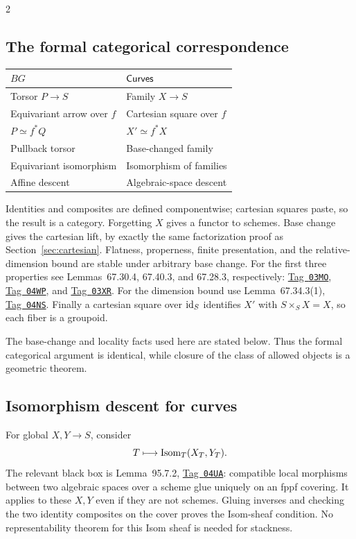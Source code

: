 \documentclass[12pt]{memoir}
\newcommand{\BGtag}[1]{\href{https://stacks.math.columbia.edu/tag/#1}{Tag~\texttt{#1}}}
\begin{document}
\begin{multicols}{2}
\subsection{The formal categorical correspondence}
\noindent
\begin{tabularx}{\linewidth}{@{}>{\raggedright\arraybackslash}X>{\raggedright\arraybackslash}X@{}}
\toprule
$BG$ & $\mathsf{Curves}$\\
\midrule
Torsor $P\to S$ & Family $X\to S$\\
Equivariant arrow over $f$ & Cartesian square over $f$\\
$P\simeq f^*Q$ & $X'\simeq f^*X$\\
Pullback torsor & Base-changed family\\
Equivariant isomorphism & Isomorphism of families\\
Affine descent & Algebraic-space descent\\
\bottomrule
\end{tabularx}
\par\smallskip

Identities and composites are defined componentwise; cartesian squares
paste, so the result is a category. Forgetting $X$ gives a functor to
schemes. Base change gives the cartesian lift, by exactly the same
factorization proof as Section~\ref{sec:cartesian}. Flatness, properness,
finite presentation, and the relative-dimension bound are stable under
arbitrary base change. For the first three properties see
Lemmas~67.30.4, 67.40.3, and 67.28.3, respectively:
\BGtag{03MO}, \BGtag{04WP}, and \BGtag{03XR}. For the dimension bound
use Lemma~67.34.3(1), \BGtag{04NS}. Finally a cartesian square over
$\operatorname{id}_S$ identifies $X'$
with $S\times_S X=X$, so each fiber is a groupoid.

The base-change and locality facts used here are stated below. Thus the
formal categorical argument is identical, while closure of the class
of allowed objects is a geometric theorem.

\subsection{Isomorphism descent for curves}
For global $X,Y\to S$, consider
\[
 T\longmapsto\operatorname{Isom}_T(X_T,Y_T).
\]
The relevant black box is Lemma~95.7.2, \BGtag{04UA}: compatible local
morphisms between two algebraic spaces over a scheme glue uniquely on
an fppf covering. It applies to these $X,Y$ even if they are not schemes.
Gluing inverses and checking the two identity composites on the cover
proves the Isom-sheaf condition. No representability theorem for this
Isom sheaf is needed for stackness.


\end{multicols}
\end{document}
